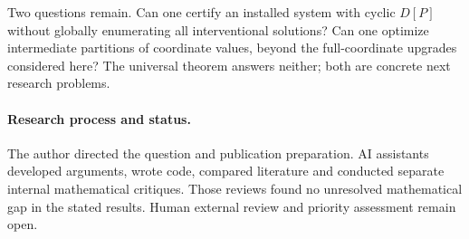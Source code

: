 \documentclass[11pt,a4paper]{article}
\theoremstyle{definition}
\theoremstyle{remark}
\begin{document}
Two questions remain. Can one certify an installed system with cyclic $D[P]$ without globally enumerating all interventional solutions? Can one optimize intermediate partitions of coordinate values, beyond the full-coordinate upgrades considered here? The universal theorem answers neither; both are concrete next research problems.

\paragraph{Research process and status.}
The author directed the question and publication preparation. AI assistants developed arguments, wrote code, compared literature and conducted separate internal mathematical critiques. Those reviews found no unresolved mathematical gap in the stated results. Human external review and priority assessment remain open.
\end{document}
